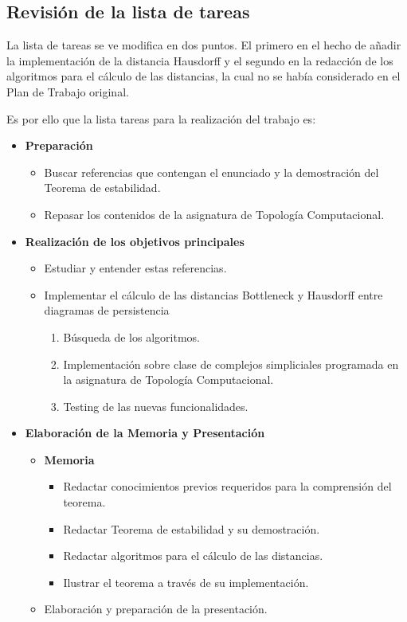 \documentclass[a4paper, 12pt]{article}
\begin{document}
\subsection{Revisión de la lista de tareas}
La lista de tareas se ve modifica en dos puntos. El primero en el hecho de añadir la implementación de la distancia Hausdorff y el segundo en la redacción de los algoritmos para el cálculo de las distancias, la cual no se había considerado en el Plan de Trabajo original.

Es por ello que la lista tareas para la realización del trabajo es:
\begin{itemize}
	\item \textbf{Preparación}
	\begin{itemize}
		\item Buscar referencias que contengan el enunciado y la demostración del Teorema de estabilidad.
		\item Repasar los contenidos de la asignatura de Topología Computacional.
	\end{itemize}
	
	\item \textbf{Realización de los objetivos principales}
	\begin{itemize}
		\item Estudiar y entender estas referencias.
		\item Implementar el cálculo de las distancias Bottleneck y Hausdorff entre diagramas de persistencia
		\begin{enumerate}
			\item Búsqueda de los algoritmos.
			\item Implementación sobre clase de complejos simpliciales programada en la asignatura de Topología Computacional.
			\item Testing de las nuevas funcionalidades.
		\end{enumerate}
	\end{itemize}
	
	\item \textbf{Elaboración de la Memoria y Presentación}
	\begin{itemize}
		\item \textbf{Memoria}
		\begin{itemize}
			\item Redactar conocimientos previos requeridos para la comprensión del teorema.
			\item Redactar Teorema de estabilidad y su demostración.
			\item Redactar algoritmos para el cálculo de las distancias.
			\item Ilustrar el teorema a través de su implementación.
		\end{itemize}
		\item Elaboración y preparación de la presentación.
	\end{itemize}
	
\end{itemize}
\end{document}
